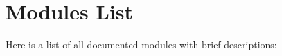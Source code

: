 \section{Modules List}
Here is a list of all documented modules with brief descriptions\+:\begin{DoxyCompactList}
\item{}
\end{DoxyCompactList}
